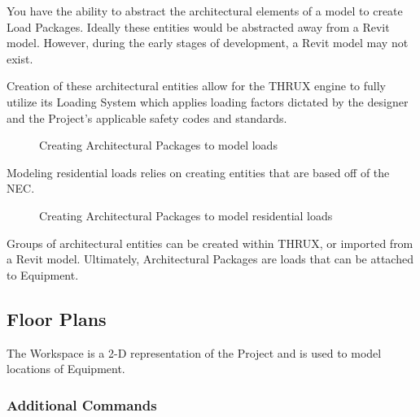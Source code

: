 \documentclass[letterpaper,10pt,english]{sphinxmanual}
\begin{document}
You have the ability to abstract the architectural elements of a model to create Load Packages.  Ideally these entities would be abstracted away from a Revit model.  However, during the early stages of development, a Revit model may not exist.

Creation of these architectural entities allow for the THRUX engine to fully utilize its Loading System which applies loading factors dictated by the designer and the Project’s applicable safety codes and standards.

\begin{figure}[H]
\centering
\capstart

\noindent{}
\caption{Creating Architectural Packages to model loads}\label{\detokenize{docs/userguide/index-user_guide:id27}}\end{figure}

Modeling residential loads relies on creating entities that are based off of the NEC.

\begin{figure}[H]
\centering
\capstart

\noindent{}
\caption{Creating Architectural Packages to model residential loads}\label{\detokenize{docs/userguide/index-user_guide:id28}}\end{figure}

Groups of architectural entities can be created within THRUX, or imported from a Revit model.  Ultimately, Architectural Packages are loads that can be attached to Equipment.


\subsection{Floor Plans}
\label{\detokenize{docs/userguide/index-user_guide:floor-plans}}\label{\detokenize{docs/userguide/index-user_guide:floor-plans-overview}}
The {\hyperref[\detokenize{docs/userguide/definingarchitecturalelements/floorplans/index-floor-plans::doc}]{}} Workspace is a 2-D representation of the Project and is used to model locations of Equipment.


\subsubsection{Additional Commands}
\label{\detokenize{docs/userguide/definingarchitecturalelements/floorplans/index-floor-plans:additional-commands}}\label{\detokenize{docs/userguide/definingarchitecturalelements/floorplans/index-floor-plans:floor-plans}}\label{\detokenize{docs/userguide/definingarchitecturalelements/floorplans/index-floor-plans::doc}}
\end{document}
